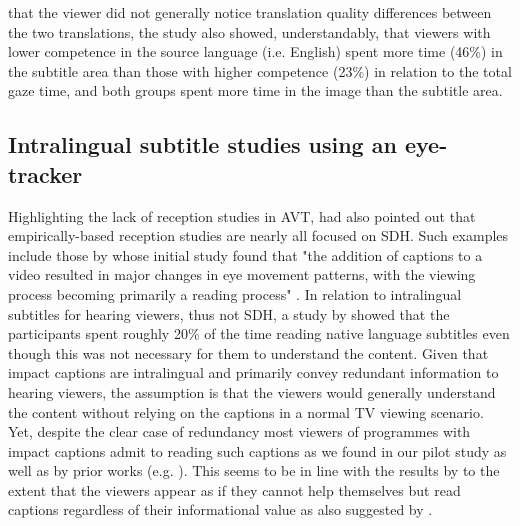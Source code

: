 \documentclass[output=paper]{langsci/langscibook}
\begin{document}
that the viewer did not generally notice translation quality differences between the two translations, the study also showed, understandably, that viewers with lower competence in the source language (i.e. English) spent more time (46\%) in the subtitle area than those with higher competence (23\%) in relation to the total gaze time, and both groups spent more time in the image than the subtitle area.


\subsection{Intralingual subtitle studies using an eye-tracker}

Highlighting the lack of reception studies in AVT, \citet[p. 30]{gambier2008} had also pointed out that empirically-based reception studies are nearly all focused on SDH.  Such examples include those by \citep{jensema2000a, jensema2000b} whose initial study found that "the addition of captions to a video resulted in major changes in eye movement patterns, with the viewing process becoming primarily a reading process" \citep[p. 275]{jensema2000a}. In relation to intralingual subtitles for hearing viewers, thus not SDH, a study by \citet{dydewalle1991} showed that the participants spent roughly 20\% of the time reading native language subtitles even though this was not necessary for them to understand the content. Given that impact captions are intralingual and primarily convey redundant information to hearing viewers, the assumption is that the viewers would generally understand the content without relying on the captions in a normal TV viewing scenario. Yet, despite the clear case of redundancy most viewers of programmes with impact captions admit to reading such captions as we found in our pilot study as well as by prior works (e.g. \citet{Kimura2000}). This seems to be in line with the results by \citet{dydewalle1991} to the extent that the viewers appear as if they cannot help themselves but read captions regardless of their informational value as also suggested by \citet{bisson2014}. 
\end{document}

